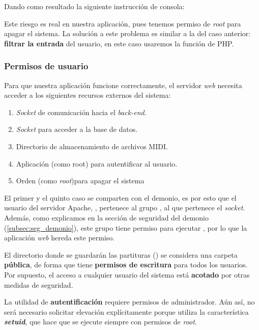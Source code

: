 Dando como resultado la siguiente instrucción de consola:

\begin{center}
\end{center}

Este riesgo es real en nuestra aplicación, pues tenemos permiso de \textit{root} para apagar el sistema. La solución a este problema es similar a la del caso anterior: \textbf{filtrar la entrada} del usuario, en este caso usaremos la función  de \acrshort{PHP}.

\subsubsection{Permisos de usuario}

Para que nuestra aplicación funcione correctamente, el servidor \textit{web} necesita acceder a los siguientes recursos externos del sistema:

\begin{enumerate}
	\item \textit{Socket} de comunicación hacia el \textit{back-end}.
	\item \textit{Socket} para acceder a la base de datos.
	\item Directorio de almacenamiento de archivos \acrshort{MIDI}.
	\item Aplicación  (como root) para autentificar al usuario.
	\item Orden  (como \textit{root})para apagar el sistema
\end{enumerate}

El primer y el quinto caso se comparten con el demonio, es por esto que el usuario del servidor Apache, , pertenece al grupo , al que pertenece el \textit{socket}. Además, como explicamos en la sección de seguridad del demonio (\ref{subsec:seg_demonio}), este grupo tiene permiso para ejecutar , por lo que la aplicación \textit{web} hereda este permiso.

El directorio donde se guardarán las partituras () se considera una carpeta \textbf{pública}, de forma que tiene \textbf{permisos de escritura} para todos los usuarios. Por supuesto, el acceso a cualquier usuario del sistema está \textbf{acotado} por otras medidas de seguridad.

La utilidad de \textbf{autentificación} requiere permisos de administrador. Aún así, no será necesario solicitar elevación explícitamente porque utiliza la característica \textbf{\textit{setuid}}, que hace que se ejecute siempre con permisos de \textit{root}.

